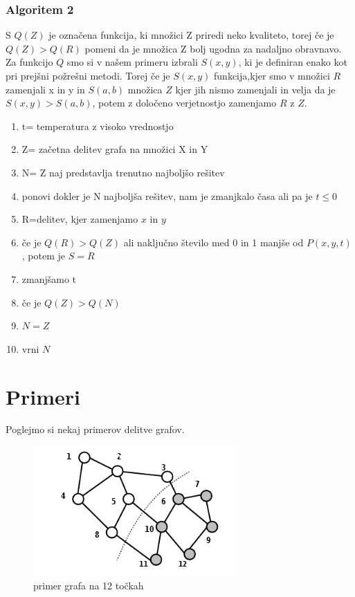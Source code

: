 \documentclass[12pt,a4paper]{amsart}
\theoremstyle{definition} %
\theoremstyle{plain} %
\begin{document}
\subsubsection{Algoritem 2}
S $Q(Z)$ je označena funkcija, ki množici Z priredi neko kvaliteto, torej če je $Q(Z) >Q(R)$ pomeni da je množica Z bolj ugodna za nadaljno obravnavo.
Za funkcijo $Q$ smo si v našem primeru izbrali $S(x,y)$, ki je definiran enako kot pri prejšni požrešni metodi. Torej če je $S(x,y)$ funkcija,kjer smo v množici $R$ zamenjali x in y in $S(a,b)$ množica $Z$ kjer jih nismo zamenjali in velja da je $S(x,y) > S(a,b)$, potem z določeno verjetnostjo zamenjamo $R$ z $Z$. 
\begin{enumerate}
\item t= temperatura z visoko vrednostjo
\item Z= začetna delitev grafa na množici X in Y 
\item N= Z  naj predstavlja trenutno najboljšo rešitev
\item ponovi dokler je N najboljša rešitev, nam je zmanjkalo časa ali pa je $t \leq 0$
\item 			R=delitev, kjer zamenjamo $x$ in $y$
\item 			če je $Q(R)>Q(Z)$ ali naključno število med 0 in 1 manjše od $P(x,y,t)$, potem je $S=R$
\item 			zmanjšamo t
\item 			če je $Q(Z)>Q(N)$ 
\item 				$N=Z$
\item vrni $N$		
\end{enumerate}


\section{Primeri}
Poglejmo si nekaj primerov delitve grafov. 

\begin{figure}[h]
    \centering
    \includegraphics{prvi_graf} 
    \caption{primer grafa na 12 točkah}
    \label{fig:1_graf}
\end{figure}
\end{document}
